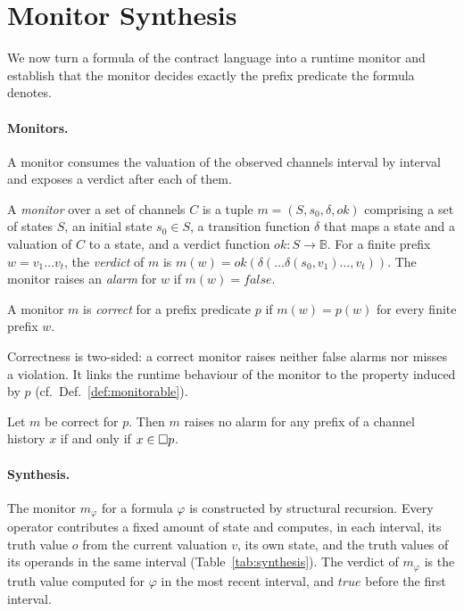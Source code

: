 \section{Monitor Synthesis}\label{sec:synthesis}

We now turn a formula of the contract language into a runtime monitor and establish that the monitor decides exactly the prefix predicate the formula denotes.

\paragraph{Monitors.}
A monitor consumes the valuation of the observed channels interval by interval and exposes a verdict after each of them.

\begin{definition}[Monitor]\label{def:monitor}
  A \emph{monitor} over a set of channels $C$ is a tuple $m = (S, s_0, \delta, \mathit{ok})$ comprising a set of states $S$, an initial state $s_0 \in S$, a transition function $\delta$ that maps a state and a valuation of $C$ to a state, and a verdict function $\mathit{ok}\colon S \to \mathbb{B}$. For a finite prefix $w = v_1 \dots v_t$, the \emph{verdict} of $m$ is $m(w) = \mathit{ok}(\delta(\dots\delta(s_0, v_1)\dots, v_t))$. The monitor raises an \emph{alarm} for $w$ if $m(w) = \mathit{false}$.
\end{definition}

\begin{definition}\label{def:correct}
  A monitor $m$ is \emph{correct} for a prefix predicate $p$ if $m(w) = p(w)$ for every finite prefix $w$.
\end{definition}

\noindent
Correctness is two-sided: a correct monitor raises neither false alarms nor misses a violation. It links the runtime behaviour of the monitor to the property induced by $p$ (cf.\ Def.~\ref{def:monitorable}).

\begin{lemma}\label{lem:silent}
  Let $m$ be correct for $p$. Then $m$ raises no alarm for any prefix of a channel history $x$ if and only if $x \in \Box p$.
\end{lemma}

\paragraph{Synthesis.}
The monitor $m_\varphi$ for a formula $\varphi$ is constructed by structural recursion. Every operator contributes a fixed amount of state and computes, in each interval, its truth value $o$ from the current valuation $v$, its own state, and the truth values of its operands in the same interval (Table~\ref{tab:synthesis}). The verdict of $m_\varphi$ is the truth value computed for $\varphi$ in the most recent interval, and $\mathit{true}$ before the first interval.

